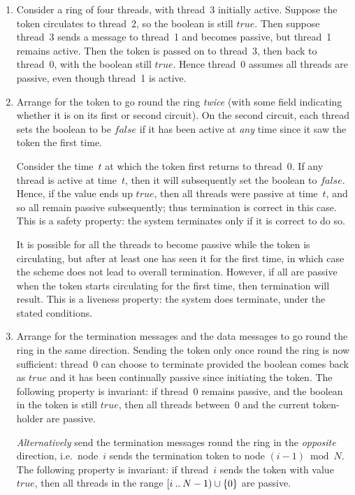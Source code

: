 
\begin{answerI}
\begin{enumerate}
\item
Consider a ring of four threads, with thread~3 initially active.  Suppose
the token circulates to thread~2, so the boolean is still $true$.  Then
suppose thread~3 sends a message to thread~1 and becomes passive, but
thread~1 remains active.  Then the token is passed on to thread~3, then
back to thread~0, with the boolean still $true$.  Hence thread~0 assumes all
threads are passive, even though thread~1 is active.


\item Arrange for the token to go round the ring \emph{twice} (with some field
indicating whether it is on its first or second circuit).  On the second
circuit, each thread sets the boolean to be $false$ if it has been active at
\emph{any} time since it saw the token the first time.

Consider the time~$t$ at which the token first returns to thread~0.  If any
thread is active at time~$t$, then it will subsequently set the boolean to
$false$.  Hence, if the value ends up $true$, then all threads were passive at
time~$t$, and so all remain passive subsequently; thus termination is correct
in this case.  This is a safety property: the system terminates only if it is
correct to do so.

It is possible for all the threads to become passive while the token is
circulating, but after at least one has seen it for the first time, in which
case the scheme does not lead to overall termination.  However, if
all are passive when the token starts circulating for the first time, then
termination will result.  This is a liveness property: the system does
terminate, under the stated conditions.


\item Arrange for the termination messages and the data messages to go round
  the ring in the same direction.  Sending the token only once round the ring
  is now sufficient: thread~$0$ can choose to terminate provided the boolean
  comes back as $true$ and it has been continually passive since initiating
  the token.  The following property is invariant: if thread~$0$ remains
  passive, and the boolean in the token is still $true$, then all threads
  between~$0$ and the current token-holder are passive.

\emph{Alternatively} send the termination messages round the ring in the
\emph{opposite} direction, i.e.~node~$i$ sends the termination token to
node ${(i-1)} \bmod N$.   The following property is invariant: if thread~$i$
sends the token with value $true$, then all threads in the range
$[i \mathbin{..} N-1) \cup \{0\}$ are passive. 
\end{enumerate}
\end{answerI}
